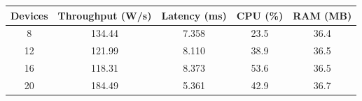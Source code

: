 \begin{tabular}{ccccc}
\toprule
\textbf{Devices} & \textbf{Throughput (W/s)} & \textbf{Latency (ms)} & \textbf{CPU (\%)} & \textbf{RAM (MB)} \\
\midrule
8 & 134.44 & 7.358 & 23.5 & 36.4 \\
12 & 121.99 & 8.110 & 38.9 & 36.5 \\
16 & 118.31 & 8.373 & 53.6 & 36.5 \\
20 & 184.49 & 5.361 & 42.9 & 36.7 \\
\bottomrule
\end{tabular}